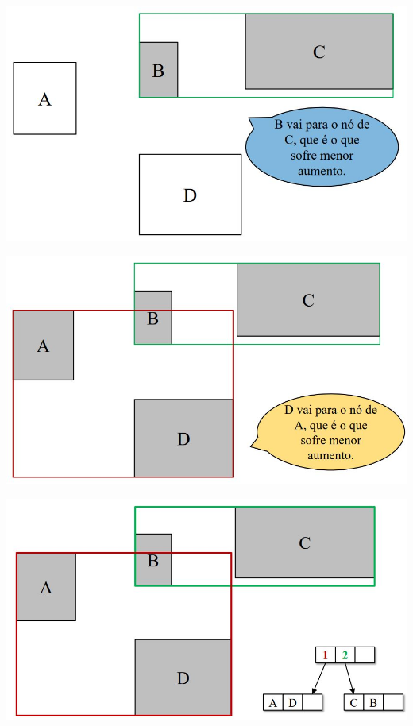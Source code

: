 \documentclass[compress,aspectratio=169]{beamer}
\begin{document}
\begin{frame}{}

        \centering
        \includegraphics[width=0.75\linewidth]{split6.JPG}
        \label{fig:enter-label}
        
\end{frame}

\begin{frame}{}

        \centering
        \includegraphics[width=0.75\linewidth]{split7.JPG}
        \label{fig:enter-label}
        
\end{frame}

\begin{frame}{}

        \centering
        \includegraphics[width=0.75\linewidth]{split8.JPG}
        \label{fig:enter-label}
        
\end{frame}
\end{document}
